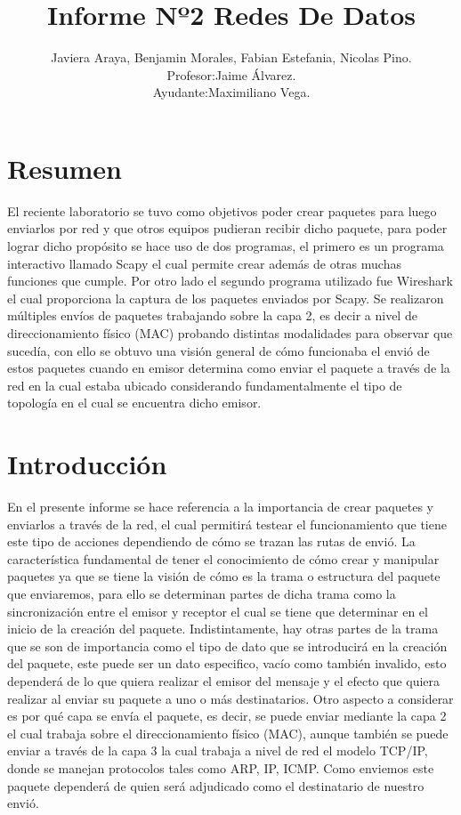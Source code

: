 \documentclass[spanish]{udpreport}
\title{Informe Nº2 Redes De Datos}
\author{Javiera Araya,
       Benjamin Morales,
        Fabian Estefania,
        Nicolas Pino.\\
        Profesor:Jaime Álvarez.\\
        Ayudante:Maximiliano Vega.}
\begin{document}
\maketitle

\tableofcontents
\chapter{Resumen  }

El reciente laboratorio se tuvo como objetivos poder crear paquetes para luego enviarlos por red y que otros equipos pudieran recibir dicho paquete, para poder lograr dicho propósito se hace uso de dos programas, el primero es un programa interactivo llamado Scapy el cual permite crear además de otras muchas funciones que cumple. Por otro lado el segundo programa utilizado fue Wireshark el cual proporciona la captura de los paquetes enviados por Scapy.
Se realizaron múltiples envíos de paquetes trabajando sobre la capa 2, es decir a nivel de direccionamiento físico (MAC) probando distintas modalidades para observar que sucedía, con ello se obtuvo una visión general de cómo funcionaba el envió de estos paquetes cuando en emisor determina como enviar el paquete a través de la red en la cual estaba ubicado considerando fundamentalmente el tipo de topología en el cual se encuentra dicho emisor.



\chapter{Introducción }
 
En el presente informe se hace referencia a la importancia de crear paquetes y enviarlos a través de la red, el cual permitirá testear el funcionamiento que tiene este tipo de acciones dependiendo de cómo se trazan las rutas de envió. 
La característica fundamental de  tener el conocimiento de cómo crear y manipular paquetes ya que se tiene la visión de cómo es la trama o estructura del paquete que enviaremos,   para ello se determinan partes de dicha trama como la sincronización entre el emisor y receptor el cual se tiene que determinar en el inicio de la creación del paquete. Indistintamente, hay otras partes de la trama que se son de importancia como el tipo de dato que se introducirá en la creación del paquete, este puede ser un dato especifico, vacío como también invalido, esto dependerá de lo que quiera realizar el emisor del mensaje y el efecto que quiera realizar al enviar su paquete a uno o más destinatarios.
Otro aspecto a considerar es por qué capa se envía el paquete, es decir, se puede enviar mediante la capa 2 el cual trabaja sobre el direccionamiento físico (MAC), aunque también se puede enviar a través de la capa 3 la cual trabaja a nivel de red  el modelo TCP/IP, donde se manejan protocolos tales como ARP, IP, ICMP. Como enviemos este paquete dependerá de quien será adjudicado como el destinatario de nuestro envió. 
\end{document}
